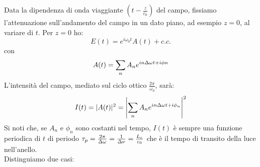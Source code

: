 Data la dipendenza di onda viaggiante $(t -\frac{z}{c_0})$ del campo, fissiamo l'attenuazione sull'andamento del campo in un dato piano, ad esempio $z=0$, al variare di $t$. Per $z=0$ ho:
\begin{equation*}
E(t) = e^{i\omega_0t} A(t) + c.c.
\end{equation*}
con
\begin{equation*}
A(t) = \sum_n A_n e^{in\Delta \omega t + i\phi n}
\end{equation*}
L'intensità del campo, mediato sul ciclo ottico $\frac{2\pi}{\omega_0}$, sarà:
\begin{equation*}
I(t) = |A(t)|^2 = \left| \sum_n A_n e^{in\Delta\omega t + i\phi_n} \right|^2
\end{equation*}
Si noti che, se $A_n$ e $\phi_n$ sono costanti nel tempo, $I(t)$ è sempre una funzione periodica di $t$ di periodo $\tau_p = \frac{2\pi}{\Delta\omega} = \frac{1}{\Delta\nu} = \frac{L_e}{c_0}$ che è il tempo di transito della luce nell'anello.\\
Distinguiamo due casi:
